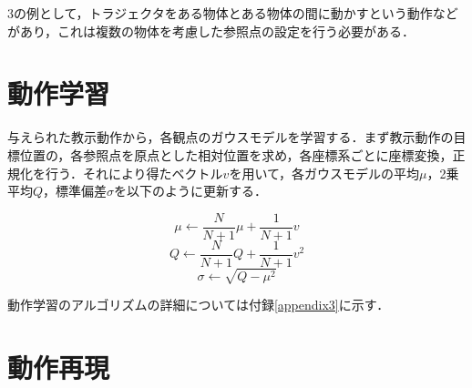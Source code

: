 3の例として，トラジェクタをある物体とある物体の間に動かすという動作などがあり，これは複数の物体を考慮した参照点の設定を行う必要がある．

\section{動作学習}

与えられた教示動作から，各観点のガウスモデルを学習する．まず教示動作の目標位置の，各参照点を原点とした相対位置を求め，各座標系ごとに座標変換，正規化を行う．それにより得たベクトル$v$を用いて，各ガウスモデルの平均$μ$，2乗平均$Q$，標準偏差$σ$を以下のように更新する．

\[
	μ  \leftarrow \frac{N}{N+1}μ+\frac{1}{N+1}v
\]
\[
	Q  \leftarrow \frac{N}{N+1}Q+\frac{1}{N+1}v^2	
\]
\[
	σ  \leftarrow \sqrt{Q - μ^2}
\]

動作学習のアルゴリズムの詳細については付録\ref{appendix3}に示す．


\section{動作再現}

